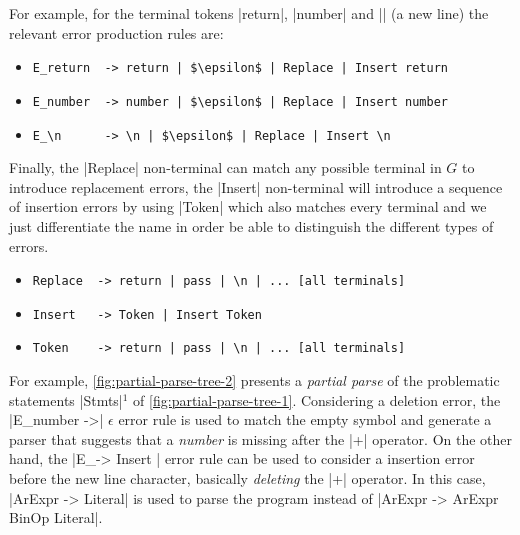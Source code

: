 For example, for the terminal tokens |return|, |number| and |\n| (a new line)
the relevant error production rules are:
\begin{itemize}
  \item \lstinline{E_return  -> return | $\epsilon$ | Replace | Insert return}
  \item \lstinline{E_number  -> number | $\epsilon$ | Replace | Insert number}
  \item \lstinline{E_\n      -> \n | $\epsilon$ | Replace | Insert \n}
\end{itemize}
Finally, the |Replace| non-terminal can match any possible terminal in $G$ to
introduce replacement errors, the |Insert| non-terminal will introduce a
sequence of insertion errors by using |Token| which also matches every terminal
and we just differentiate the name in order be able to distinguish the different
types of errors.
\begin{itemize}
  \item \lstinline{Replace  -> return | pass | \n | ... [all terminals]}
  \item \lstinline{Insert   -> Token | Insert Token}
  \item \lstinline{Token    -> return | pass | \n | ... [all terminals]}
\end{itemize}







For example, \autoref{fig:partial-parse-tree-2} presents a \emph{partial parse}
of the problematic statements |Stmts|$^1$ of \autoref{fig:partial-parse-tree-1}.
Considering a deletion error, the |E_number ->| $\epsilon$ error rule is used to
match the empty symbol and generate a parser that suggests that a \emph{number}
is missing after the |+| operator. On the other hand, the |E_\n -> Insert \n|
error rule can be used to consider a insertion error before the new line
character, basically \emph{deleting} the |+| operator. In this case,
|ArExpr -> Literal| is used to parse the program instead of
|ArExpr -> ArExpr BinOp Literal|.

